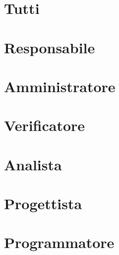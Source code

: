 \documentclass[a4paper, 12pt]{article}
\begin{document}
\copertina{}

\newpage

\setcounter{tocdepth}{2}
\tableofcontents
\newpage

\newpage

\section{Tutti}


\section{Responsabile}






\section{Amministratore}



\section{Verificatore}



\section{Analista}


\section{Progettista}


\section{Programmatore}

\end{document}
